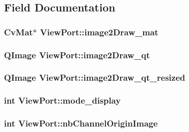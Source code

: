 \subsection{Field Documentation}
\hypertarget{classViewPort_af6a3576406241b379379cc6d1a6d0c4f}{
\subsubsection[{image2\-Draw\-\_\-mat}]{\setlength{\rightskip}{0pt plus 5cm}Cv\-Mat$\ast$ View\-Port\-::image2\-Draw\-\_\-mat}}\label{classViewPort_af6a3576406241b379379cc6d1a6d0c4f}
\hypertarget{classViewPort_affb4d66105d8c57b62a8d1ca3a2f2aae}{
\subsubsection[{image2\-Draw\-\_\-qt}]{\setlength{\rightskip}{0pt plus 5cm}Q\-Image View\-Port\-::image2\-Draw\-\_\-qt}}\label{classViewPort_affb4d66105d8c57b62a8d1ca3a2f2aae}
\hypertarget{classViewPort_a69c446903d67c1e328c8398341c2da21}{
\subsubsection[{image2\-Draw\-\_\-qt\-\_\-resized}]{\setlength{\rightskip}{0pt plus 5cm}Q\-Image View\-Port\-::image2\-Draw\-\_\-qt\-\_\-resized}}\label{classViewPort_a69c446903d67c1e328c8398341c2da21}
\hypertarget{classViewPort_abdd3f74adf3deb4bc1808f669d8815a4}{
\subsubsection[{mode\-\_\-display}]{\setlength{\rightskip}{0pt plus 5cm}int View\-Port\-::mode\-\_\-display}}\label{classViewPort_abdd3f74adf3deb4bc1808f669d8815a4}
\hypertarget{classViewPort_a023381fa2838df1c3ef3a9183f4abbd1}{
\subsubsection[{nb\-Channel\-Origin\-Image}]{\setlength{\rightskip}{0pt plus 5cm}int View\-Port\-::nb\-Channel\-Origin\-Image}}\label{classViewPort_a023381fa2838df1c3ef3a9183f4abbd1}
